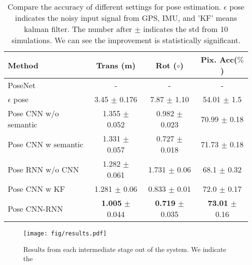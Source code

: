 \begin{table}
\center
\fontsize{8}{9}\selectfont
\begin{tabular}{lccc}
\toprule[0.1 em]
Method & Trans (m) & Rot ($\circ$) & Pix. Acc($\%$)\\
\hline
PoseNet~\cite{kendall2017geometric} & -  & -  & -  \\
$\epsilon$ pose & 3.45 $\pm$ 0.176 & 7.87 $\pm$ 1.10 & 54.01 $\pm$ 1.5 \\
Pose CNN w/o semantic & 1.355 $\pm$ 0.052  & 0.982 $\pm$ 0.023 & 70.99 $\pm$ 0.18 \\
Pose CNN w semantic & 1.331 $\pm$ 0.057  & 0.727 $\pm$ 0.018 & 71.73 $\pm$ 0.18  \\
Pose RNN w/o CNN & 1.282 $\pm$ 0.061  & 1.731 $\pm$ 0.06 &  68.1 $\pm$ 0.32 \\
Pose CNN w KF & 1.281 $\pm$ 0.06  & 0.833 $\pm$ 0.01 & 72.0 $\pm$ 0.17  \\
Pose CNN-RNN  & \textbf{1.005} $\pm$ 0.044  & \textbf{0.719} $\pm$ 0.035  & \textbf{73.01} $\pm$ 0.16  \\
\toprule[0.1 em]
\end{tabular}
\caption{Compare the accuracy of different settings for pose estimation.
$\epsilon$ pose indicates the noisy input signal from GPS, IMU, and 'KF' means kalman filter.
The number after $\pm$ indicates the std from 10 simulations. We can see the improvement is statistically significant.}
\label{tbl:pose}
\vspace{-0.3\baselineskip}
\end{table}

\begin{figure*}
\texttt{[image: fig/results.pdf]}
   \caption{Results from each intermediate stage out of the system. We indicate the }
\label{fig:results}
\vspace{-0.8\baselineskip}
\end{figure*}

